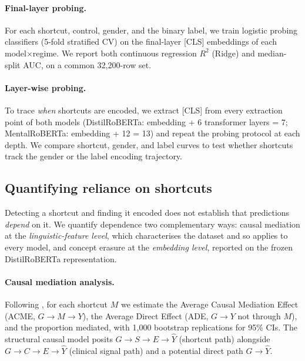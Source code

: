 \documentclass[11pt]{article}
\begin{document}
\paragraph{Final-layer probing.}
For each shortcut, control, gender, and the binary label, we train logistic probing classifiers (5-fold stratified CV) on the final-layer [CLS] embeddings of each model$\times$regime. We report both continuous regression $R^2$ (Ridge) and median-split AUC, on a common 32{,}200-row set.

\paragraph{Layer-wise probing.}
To trace \textit{when} shortcuts are encoded, we extract [CLS] from every extraction point of both models (DistilRoBERTa: embedding + 6 transformer layers = 7; MentalRoBERTa: embedding + 12 = 13) and repeat the probing protocol at each depth. We compare shortcut, gender, and label curves to test whether shortcuts track the gender or the label encoding trajectory.

\subsection{Quantifying reliance on shortcuts}

Detecting a shortcut and finding it encoded does not establish that predictions \emph{depend} on it. We quantify dependence two complementary ways: causal mediation at the \textit{linguistic-feature level}, which characterises the dataset and so applies to every model, and concept erasure at the \textit{embedding level}, reported on the frozen DistilRoBERTa representation.

\paragraph{Causal mediation analysis.}
Following \citet{imai2010general}, for each shortcut $M$ we estimate the Average Causal Mediation Effect (ACME, $G \to M \to Y$), the Average Direct Effect (ADE, $G \to Y$ not through $M$), and the proportion mediated, with 1{,}000 bootstrap replications for 95\% CIs. The structural causal model posits $G \to S \to E \to \hat{Y}$ (shortcut path) alongside $G \to C \to E \to \hat{Y}$ (clinical signal path) and a potential direct path $G \to \hat{Y}$.
\end{document}
